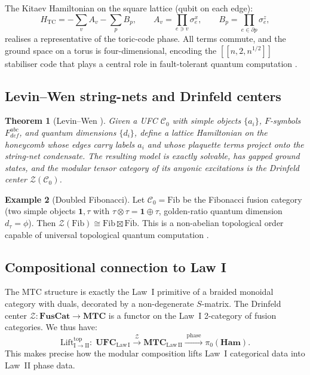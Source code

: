 \documentclass[12pt]{article}
\theoremstyle{plain}
\newtheorem{theorem}{Theorem}[section]
\theoremstyle{definition}
\newtheorem{example}[theorem]{Example}
\theoremstyle{remark}
\newcommand{\Ham}{\mathbf{Ham}}
\begin{document}
The Kitaev Hamiltonian on the square lattice (qubit on each edge):
\begin{equation}
\label{eq:toric-ham}
H_{\mathrm{TC}} = -\sum_{v}A_{v} - \sum_{p}B_{p}, \qquad
A_{v}=\prod_{e\ni v}\sigma^{x}_{e}, \qquad
B_{p}=\prod_{e\in\partial p}\sigma^{z}_{e},
\end{equation}
realises a representative of the toric-code phase. All terms commute, and the ground
space on a torus is four-dimensional, encoding the $[[n,2,n^{1/2}]]$ stabiliser code that
plays a central role in fault-tolerant quantum computation \cite{Kitaev2003}.

\subsection{Levin--Wen string-nets and Drinfeld centers}

\begin{theorem}[Levin--Wen \cite{LevinWen2005}]
\label{thm:lw}
Given a UFC $\mathcal{C}_{0}$ with simple objects $\{a_{i}\}$, $F$-symbols $F^{abc}_{def}$,
and quantum dimensions $\{d_{i}\}$, define a lattice Hamiltonian on the honeycomb whose
edges carry labels $a_{i}$ and whose plaquette terms project onto the string-net
condensate. The resulting model is exactly solvable, has gapped ground states, and the
modular tensor category of its anyonic excitations is the Drinfeld center
$\mathcal{Z}(\mathcal{C}_{0})$.
\end{theorem}

\begin{example}[Doubled Fibonacci]
\label{ex:fib}
Let $\mathcal{C}_{0}=\mathrm{Fib}$ be the Fibonacci fusion category (two simple objects
$\mathbf{1},\tau$ with $\tau\otimes\tau=\mathbf{1}\oplus\tau$, golden-ratio quantum
dimension $d_{\tau}=\phi$). Then $\mathcal{Z}(\mathrm{Fib})\cong\mathrm{Fib}\boxtimes
\overline{\mathrm{Fib}}$. This is a non-abelian topological order capable of universal
topological quantum computation \cite{Wang2010}.
\end{example}

\subsection{Compositional connection to Law I}

The MTC structure is exactly the Law~I primitive of a braided monoidal category with
duals, decorated by a non-degenerate $S$-matrix. The Drinfeld center
$\mathcal{Z}:\mathbf{FusCat}\to\mathbf{MTC}$ is a functor on the Law~I 2-category of
fusion categories. We thus have:
\begin{equation}
\label{eq:lift1to2}
\mathrm{Lift}_{\mathrm{I}\to\mathrm{II}}^{\mathrm{top}}:\;
\mathbf{UFC}_{\mathrm{Law\,I}} \xrightarrow{\;\mathcal{Z}\;}
\mathbf{MTC}_{\mathrm{Law\,II}} \xrightarrow{\;\mathrm{phase}\;}
\pi_{0}(\Ham).
\end{equation}
This makes precise how the modular composition lifts Law~I categorical data into
Law~II phase data.
\end{document}
